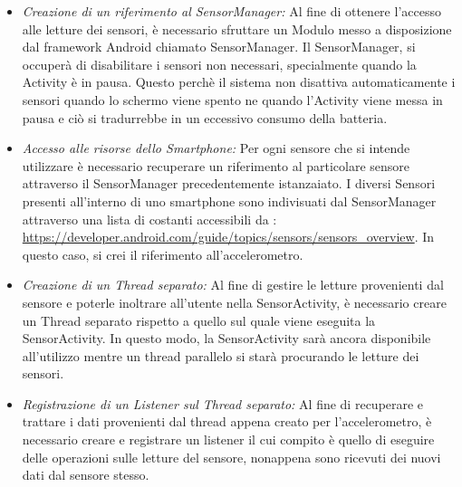 \begin{itemize}
	\item \textit{Creazione di un riferimento al SensorManager:} Al fine di ottenere l'accesso alle letture dei sensori, è necessario sfruttare un Modulo messo a disposizione dal framework Android chiamato SensorManager. Il SensorManager, si occuperà di disabilitare i sensori non necessari, specialmente quando la Activity è in pausa. Questo perchè il sistema non disattiva automaticamente i sensori quando lo schermo viene spento ne quando l'Activity viene messa in pausa e ciò si tradurrebbe in un eccessivo consumo della batteria.
	
	
	\item \textit{Accesso alle risorse dello Smartphone:} Per ogni sensore che si intende utilizzare è necessario recuperare un riferimento al particolare sensore attraverso il SensorManager precedentemente istanzaiato. I diversi Sensori presenti all'interno di uno smartphone sono indivisuati dal SensorManager attraverso una lista di costanti accessibili da : \url{https://developer.android.com/guide/topics/sensors/sensors_overview}. In questo caso, si crei il riferimento all'accelerometro.
	
	
	\item \textit{Creazione di un Thread separato:} Al fine di gestire le letture provenienti dal sensore e poterle inoltrare all'utente nella SensorActivity, è necessario creare un Thread separato rispetto a quello sul quale viene eseguita la SensorActivity. In questo modo, la SensorActivity sarà ancora disponibile all'utilizzo mentre un thread parallelo si starà procurando le letture dei sensori.
	
	
	\item \textit{Registrazione di un Listener sul Thread separato:} Al fine di recuperare e trattare i dati provenienti dal thread appena creato per l'accelerometro, è necessario creare e registrare un listener il cui compito è quello di eseguire delle operazioni sulle letture del sensore, nonappena sono ricevuti dei nuovi dati dal sensore stesso.
	
	
	

\end{itemize}
